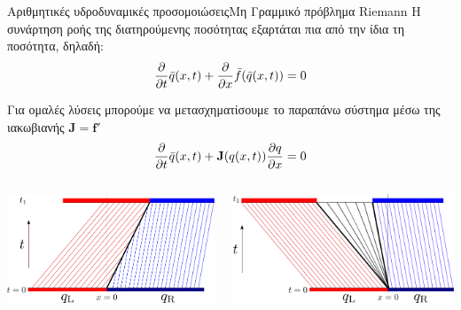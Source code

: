 \documentclass{beamer}
\begin{document}
\begin{frame}{Αριθμητικές υδροδυναμικές προσομοιώσεις}{Μη Γραμμικό πρόβλημα Riemann}
	Η συνάρτηση ροής της διατηρούμενης ποσότητας εξαρτάται πια από την ίδια τη ποσότητα, δηλαδή:
	\begin{equation}
	\pdv{t} \bar{q}(x,t) + \pdv{x} \bar{f}(\bar{q}(x,t)) = 0 
	\end{equation}
	
	Για ομαλές λύσεις μπορούμε να μετασχηματίσουμε το παραπάνω σύστημα μέσω της ιακωβιανής $\mathbf{J} =\mathbf{f}'$
	\begin{equation}
	\pdv{t} \bar{q}(x,t) + \mathbf{J}(q(x,t)) \pdv{q}{x}  = 0 
	\end{equation}
	
	\begin{columns}
			\begin{center}
				\includegraphics[width=0.9\linewidth]{../Document/Images/shockwave}
			\end{center}
			\begin{center}
				\includegraphics[width=0.9\linewidth]{../Document/Images/rarefuctionwave}
			\end{center}
	\end{columns}
\end{frame}	
\end{document}
